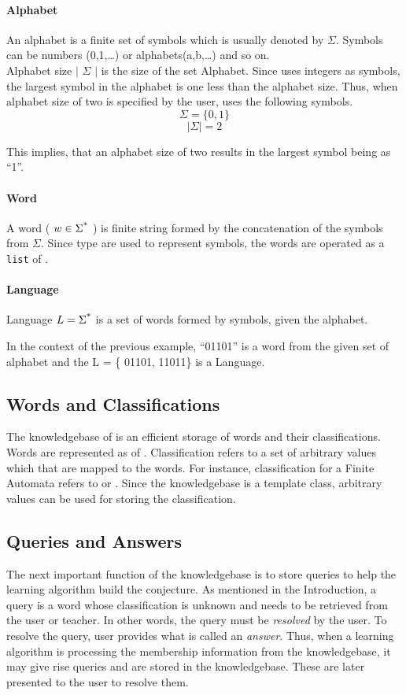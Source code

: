 \paragraph{Alphabet} An alphabet is a finite set of symbols which is usually denoted by $\Sigma$. 
Symbols can be numbers (0,1,\ldots) or alphabets(a,b,\ldots) and so on. \\
Alphabet size $\mid$ $\Sigma$ $\mid$ is the size of the set Alphabet. Since \libalf uses integers as symbols, the largest symbol in the alphabet is one less than the alphabet size. Thus, when alphabet size of two is specified by the user, \libalf uses the following symbols. 
\[
\Sigma = \{0,1\}
\]
\[
\mid \Sigma \mid = 2
\]

This implies, that an alphabet size of two results in the largest symbol being as ``1''.

\paragraph{Word} A word ( $ w \in \Sigma \textsuperscript{*} $ ) is finite string formed by the concatenation of the symbols from $\Sigma$. Since \integer type are used to represent symbols, the words are operated as a \texttt{list} of \integer.  

\paragraph{Language} Language $ L = \Sigma \textsuperscript{*} $ is a set of words formed by symbols, given the alphabet.

In the context of the previous example, ``01101'' is a word from the given set of alphabet and the L = \{ 01101, 11011\} is a Language.

\subsection*{Words and Classifications} 
The knowledgebase of \libalf is an efficient storage of words and their classifications. Words are represented as \lists of \integer. Classification refers to a set of arbitrary values which that are mapped to the words. For instance, classification for a Finite Automata refers to \true or \false. Since the knowledgebase is a template class, arbitrary values can be used for storing the classification. 

\subsection*{Queries and Answers} 
The next important function of the knowledgebase is to store queries to help the learning algorithm build the conjecture. As mentioned in the Introduction, a query is a word whose classification is unknown and needs to be retrieved from the user or teacher. In other words, the query must be \emph{resolved} by the user. To resolve the query, user provides what is called an \emph{answer}. Thus, when a learning algorithm is processing the membership information from the knowledgebase, it may give rise queries and are stored in the knowledgebase. These are later presented to the user to resolve them.

